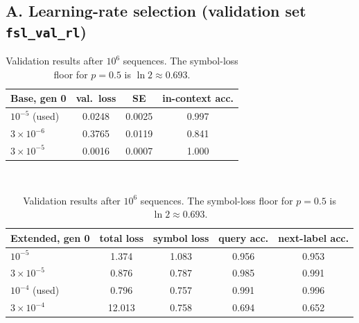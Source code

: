 \subsection*{A. Learning-rate selection (validation set \texttt{fsl\_val\_rl})}
\begin{table}[H]\centering\small
\begin{tabular}{lccc}\toprule
Base, gen 0 & val.\ loss & SE & in-context acc.\\\midrule
$10^{-5}$ (used) & 0.0248 & 0.0025 & 0.997\\
$3{\times}10^{-6}$ & 0.3765 & 0.0119 & 0.841\\
$3{\times}10^{-5}$ & 0.0016 & 0.0007 & 1.000\\
\bottomrule\end{tabular}\\[6pt]
\begin{tabular}{lcccc}\toprule
Extended, gen 0 & total loss & symbol loss & query acc. & next-label acc.\\\midrule
$10^{-5}$ & 1.374 & 1.083 & 0.956 & 0.953\\
$3{\times}10^{-5}$ & 0.876 & 0.787 & 0.985 & 0.991\\
$10^{-4}$ (used) & 0.796 & 0.757 & 0.991 & 0.996\\
$3{\times}10^{-4}$ & 12.013 & 0.758 & 0.694 & 0.652\\
\bottomrule\end{tabular}
\caption{Validation results after $10^6$ sequences. The symbol-loss floor for $p{=}0.5$ is $\ln 2\approx0.693$.}
\end{table}

